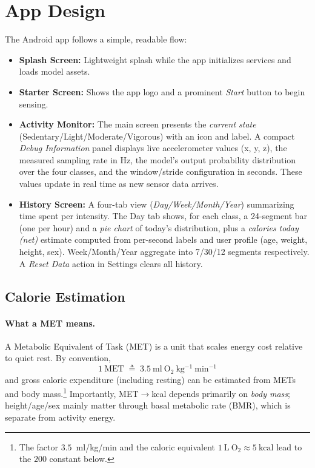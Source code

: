 \documentclass[10pt,twocolumn]{article}
\begin{document}
\section{App Design}
\label{sec:app-design}
The Android app follows a simple, readable flow:
\begin{itemize}
  \item \textbf{Splash Screen:} Lightweight splash while the app initializes services and loads model assets.
  \item \textbf{Starter Screen:} Shows the app logo and a prominent \emph{Start} button to begin sensing.
  \item \textbf{Activity Monitor:} The main screen presents the \emph{current state} (Sedentary/Light/Moderate/Vigorous) with an icon and label. A compact \emph{Debug Information} panel displays live accelerometer values (x, y, z), the measured sampling rate in Hz, the model's output probability distribution over the four classes, and the window/stride configuration in seconds. These values update in real time as new sensor data arrives.
  \item \textbf{History Screen:} A four-tab view (\emph{Day/Week/Month/Year}) summarizing time spent per intensity. The Day tab shows, for each class, a 24-segment bar (one per hour) and a \emph{pie chart} of today's distribution, plus a \emph{calories today (net)} estimate computed from per-second labels and user profile (age, weight, height, sex). Week/Month/Year aggregate into 7/30/12 segments respectively. A \emph{Reset Data} action in Settings clears all history.
\end{itemize}

\subsection{Calorie Estimation}\label{sec:calorie}

\paragraph{What a MET means.}
A Metabolic Equivalent of Task (MET) is a unit that scales energy cost relative to quiet rest.
By convention,
\[
1~\mathrm{MET} \;\triangleq\; 3.5~\mathrm{ml~O_2~kg^{-1}~min^{-1}}
\]
and gross caloric expenditure (including resting) can be estimated from METs and body mass.\footnote{The factor $3.5$~ml/kg/min and the caloric equivalent $1~\mathrm{L~O_2}\!\approx\!5~\mathrm{kcal}$ lead to the $200$ constant below.}
Importantly, MET$\to$kcal depends primarily on \emph{body mass}; height/age/sex mainly matter through basal metabolic rate (BMR), which is separate from activity energy.
\end{document}
